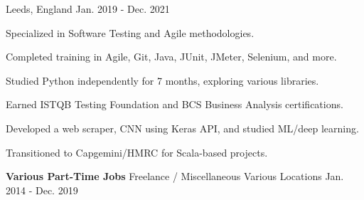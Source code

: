 \begin{cventries}
    {Leeds, England} 
    {Jan. 2019 - Dec. 2021}
    {
      \begin{sloppypar}  
      \begin{cvitems}
        \item {Specialized in Software Testing and Agile methodologies.}
        \item {Completed training in Agile, Git, Java, JUnit, JMeter, Selenium, and more.}
        \item {Studied Python independently for 7 months, exploring various libraries.}
        \item {Earned ISTQB Testing Foundation and BCS Business Analysis certifications.}
        \item {Developed a web scraper, CNN using Keras API, and studied ML/deep learning.}
        \item {Transitioned to Capgemini/HMRC for Scala-based projects.}
      \end{cvitems}
      \end{sloppypar}
    }    

\cventry
    {\textbf{Various Part-Time Jobs}} 
    {Freelance / Miscellaneous} 
    {Various Locations} 
    {Jan. 2014 - Dec. 2019}
    {}      

\end{cventries}
